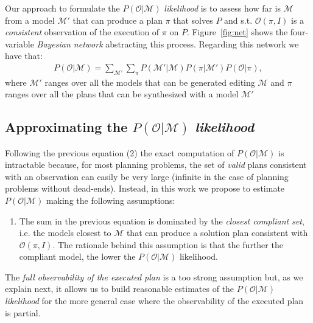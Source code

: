 \documentclass[letterpaper]{article} %
\begin{document}
Our approach to formulate the $P(\mathcal{O}|\mathcal{M})$ {\em likelihood} is to assess how far is $\mathcal{M}$ from a model $\mathcal{M'}$ that can produce a plan $\pi$ that solves $P$ and s.t. $\mathcal{O}(\pi,I)$ is a {\em consistent} observation of the execution of $\pi$ on $P$. Figure~\ref{fig:net} shows the four-variable {\em Bayesian network} abstracting this process. Regarding this network we have that:
\begin{align}
 P(\mathcal{O}|\mathcal{M})=\sum_{\mathcal{M}'}\sum_{\pi} P(\mathcal{M'}|\mathcal{M})P(\pi|\mathcal{M'})P(\mathcal{O}|\pi),
\end{align}
where $\mathcal{M}'$ ranges over all the models that can be generated editing $\mathcal{M}$ and $\pi$ ranges over all the plans that can be synthesized with a model $\mathcal{M}'$

\subsection{Approximating the $P(\mathcal{O}|\mathcal{M})$ {\em likelihood}}
Following the previous equation (2) the exact computation of $P(\mathcal{O}|\mathcal{M})$ is intractable because, for most planning problems, the set of {\em valid} plans consistent with an observation can easily be very large (infinite in the case of planning problems without dead-ends). Instead, in this work we propose to estimate $P(\mathcal{O}|\mathcal{M})$ making the following assumptions:
\begin{enumerate}
\item The sum in the previous equation is dominated by the {\em closest compliant set}, i.e. the models closest to $\mathcal{M}$ that can produce a solution plan consistent with $\mathcal{O}(\pi,I)$. The rationale behind this assumption is that the further the compliant model, the lower the $P(\mathcal{O}|\mathcal{M})$ likelihood. 
\end{enumerate}

The {\em full observability of the executed plan} is a too strong assumption but, as we explain next, it allows us to build reasonable estimates of the $P(\mathcal{O}|\mathcal{M})$ {\em likelihood} for the more general case where the observability of the executed plan is partial.
\end{document}
